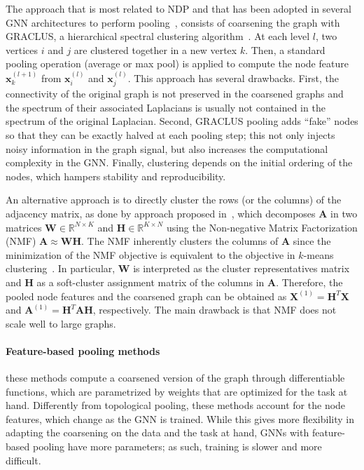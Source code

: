\documentclass[journal]{IEEEtran}
\def\x{{\mathbf x}}
\def\X{{\mathbf X}}
\def\A{{\mathbf A}}
\begin{document}
The approach that is most related to NDP and that has been adopted in several GNN architectures to perform pooling~\cite{bruna2013spectral, defferrard2016convolutional, monti2017geometric, fey2018splinecnn, levie2017cayleynets}, consists of coarsening the graph with GRACLUS, a hierarchical spectral clustering algorithm~\cite{dhillon2004kernel}. 
At each level $l$, two vertices $i$ and $j$ are clustered together in a new vertex $k$.
Then, a standard pooling operation (average or max pool) is applied to compute the node feature $\x^{(l+1)}_k$ from $\x^{(l)}_i$ and $\x^{(l)}_j$.
This approach has several drawbacks.
First, the connectivity of the original graph is not preserved in the coarsened graphs and the spectrum of their associated Laplacians is usually not contained in the spectrum of the original Laplacian.
Second, GRACLUS pooling adds ``fake'' nodes so that they can be exactly halved at each pooling step; this not only injects noisy information in the graph signal, but also increases the computational complexity in the GNN. Finally, clustering depends on the initial ordering of the nodes, which hampers stability and reproducibility.



An alternative approach is to directly cluster the rows (or the columns) of the adjacency matrix, as done by approach proposed in~\cite{bacciu2019non}, which decomposes $\A$ in two matrices $\mathbf{W} \in \mathbb{R}^{N \times K}$ and $\mathbf{H} \in \mathbb{R}^{K \times N}$ using the Non-negative Matrix Factorization (NMF) $\A \approx \mathbf{W}\mathbf{H}$.
The NMF inherently clusters the columns of $\A$ since the minimization of the NMF objective is equivalent to the objective in $k$-means clustering~\cite{ding2005equivalence}.
In particular, $\mathbf{W}$ is interpreted as the cluster representatives matrix and $\mathbf{H}$ as a soft-cluster assignment matrix of the columns in $\A$. 
Therefore, the pooled node features and the coarsened graph can be obtained as $\X^{(1)} = \mathbf{H}^T\X$ and $\A^{(1)} = \mathbf{H}^T \A \mathbf{H}$, respectively.
The main drawback is that NMF does not scale well to large graphs.



\paragraph{Feature-based pooling methods}
these methods compute a coarsened version of the graph through differentiable functions, which are parametrized by weights that are optimized for the task at hand.
Differently from topological pooling, these methods account for the node features, which change as the GNN is trained.
While this gives more flexibility in adapting the coarsening on the data and the task at hand, GNNs with feature-based pooling have more parameters; as such, training is slower and more difficult.
\end{document}
